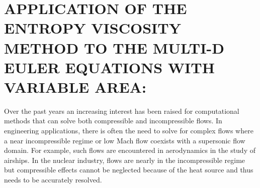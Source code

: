 %
%
%


\chapter{\uppercase {Application of the entropy viscosity method to the multi-D Euler equations with variable area:}}\label{chap:euler}
Over the past years an increasing interest has been raised for computational methods that can solve both compressible and incompressible flows. In engineering applications, there is often the need to solve for complex flows where a near incompressible regime or low Mach flow coexists with a supersonic flow domain. For example, such flows are encountered in aerodynamics in the study of airships. In the nuclear industry, flows are nearly in the incompressible regime but compressible effects cannot be neglected because of the heat source and thus needs to be accurately resolved. \\
